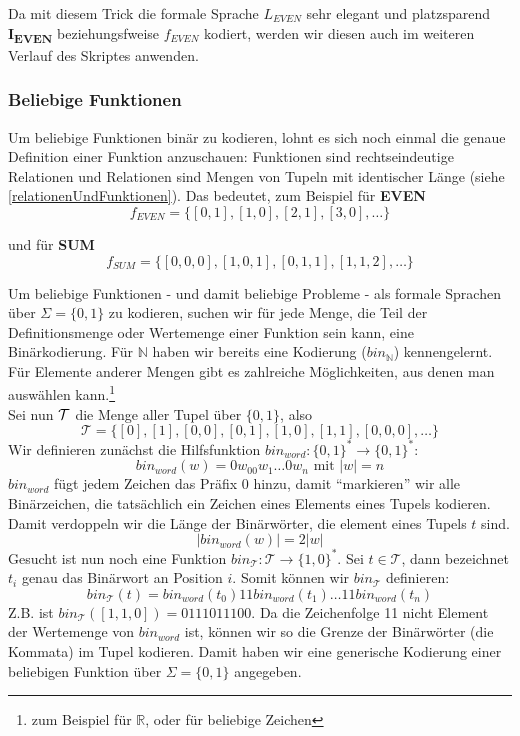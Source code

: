 Da mit diesem Trick die formale Sprache $L_{EVEN}$ sehr elegant und platzsparend
\textbf{I\textsubscript{EVEN}} beziehungsfweise $f_{EVEN}$ kodiert,
werden wir diesen auch im weiteren Verlauf des Skriptes anwenden.

\subsubsection{Beliebige Funktionen}
Um beliebige Funktionen binär zu kodieren,
lohnt es sich noch einmal die genaue Definition einer Funktion anzuschauen:
Funktionen sind rechtseindeutige Relationen und Relationen sind Mengen von Tupeln mit identischer Länge (siehe \autoref{relationenUndFunktionen}).
Das bedeutet, zum Beispiel für \textbf{EVEN}
\[
    f_{EVEN} = \{ [0,1], [1,0], [2,1], [3,0], \ldots \}
\]

und für \textbf{SUM}
\[
    f_{SUM} = \{ [0,0,0], [1,0,1], [0,1,1], [1,1,2], \ldots \}
\]

Um beliebige Funktionen - und damit beliebige Probleme -
als formale Sprachen über $\Sigma = \{0,1\}$ zu kodieren,
suchen wir für jede Menge,
die Teil der Definitionsmenge oder Wertemenge einer Funktion sein kann,
eine Binärkodierung.
Für $\mathbb{N}$
haben wir bereits eine Kodierung ($bin_{\mathbb{N}}$) kennengelernt.
Für Elemente anderer Mengen gibt es zahlreiche Möglichkeiten,
aus denen man auswählen kann.\footnote{
    zum Beispiel \cite{ieee754} für $\mathbb{R}$,
    oder \cite{RFC3629} für beliebige Zeichen
}\\

\noindent
Sei nun $\cal{T}$ die Menge aller Tupel über $\{0,1\}$, also
\[
    \mathcal{T} = \{[0], [1], [0,0], [0,1], [1,0], [1,1], [0,0,0], \ldots \}
\]
Wir definieren zunächst die Hilfsfunktion $bin_{word}: \{0,1\}^* \rightarrow \{0,1\}^*$:
\[
    bin_{word}(w) = 0w_00w_1\ldots0w_n \text{ mit } |w| = n
\]
$bin_{word}$ fügt jedem Zeichen das Präfix 0 hinzu,
damit ``markieren'' wir alle Binärzeichen,
die tatsächlich ein Zeichen eines Elements eines Tupels kodieren.
Damit verdoppeln wir die Länge der Binärwörter, die element eines Tupels $t$ sind.
\[
    |bin_{word}(w)| = 2|w| 
\]
Gesucht ist nun noch eine Funktion $bin_{\mathcal{T}}: \mathcal{T} \rightarrow \{1,0\}^*$.
Sei $t \in \mathcal{T}$, dann bezeichnet $t_i$ genau das Binärwort an Position $i$.
Somit können wir $bin_{\mathcal{T}}$ definieren:
\[
    bin_{\mathcal{T}}(t) = bin_{word}(t_0)11bin_{word}(t_1)\ldots 11bin_{word}(t_{n})
\]
Z.B. ist $bin_{\mathcal{T}}([1,1,0]) = 0111011100$.
Da die Zeichenfolge 11 nicht Element der Wertemenge von $bin_{word}$ ist,
können wir so die Grenze der Binärwörter (die Kommata) im Tupel kodieren.
Damit haben wir eine generische Kodierung einer beliebigen Funktion
über $\Sigma = \{0,1\}$ angegeben.

